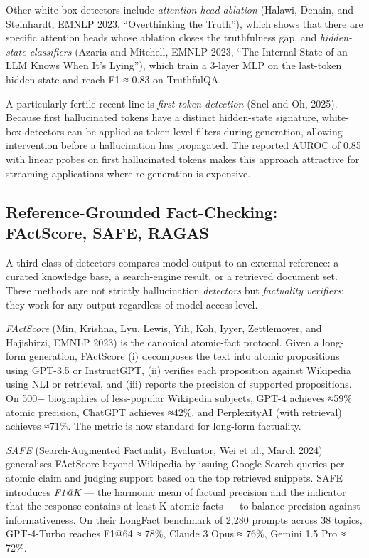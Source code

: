 Other white-box detectors include \emph{attention-head ablation} (Halawi, Denain, and Steinhardt, EMNLP 2023, ``Overthinking the Truth''), which shows that there are specific attention heads whose ablation closes the truthfulness gap, and \emph{hidden-state classifiers} (Azaria and Mitchell, EMNLP 2023, ``The Internal State of an LLM Knows When It's Lying''), which train a 3-layer MLP on the last-token hidden state and reach F1 ≈ 0.83 on TruthfulQA.

A particularly fertile recent line is \emph{first-token detection} (Snel and Oh, 2025). Because first hallucinated tokens have a distinct hidden-state signature, white-box detectors can be applied as token-level filters during generation, allowing intervention before a hallucination has propagated. The reported AUROC of 0.85 with linear probes on first hallucinated tokens makes this approach attractive for streaming applications where re-generation is expensive.

\subsection{Reference-Grounded Fact-Checking: FActScore, SAFE, RAGAS}\label{reference-grounded-fact-checking-factscore-safe-ragas}

A third class of detectors compares model output to an external reference: a curated knowledge base, a search-engine result, or a retrieved document set. These methods are not strictly hallucination \emph{detectors} but \emph{factuality verifiers}; they work for any output regardless of model access level.

\emph{FActScore} (Min, Krishna, Lyu, Lewis, Yih, Koh, Iyyer, Zettlemoyer, and Hajishirzi, EMNLP 2023) is the canonical atomic-fact protocol. Given a long-form generation, FActScore (i) decomposes the text into atomic propositions using GPT-3.5 or InstructGPT, (ii) verifies each proposition against Wikipedia using NLI or retrieval, and (iii) reports the precision of supported propositions. On 500+ biographies of less-popular Wikipedia subjects, GPT-4 achieves ≈59\% atomic precision, ChatGPT achieves ≈42\%, and PerplexityAI (with retrieval) achieves ≈71\%. The metric is now standard for long-form factuality.

\emph{SAFE} (Search-Augmented Factuality Evaluator, Wei et al., March 2024) generalises FActScore beyond Wikipedia by issuing Google Search queries per atomic claim and judging support based on the top retrieved snippets. SAFE introduces \emph{F1@K} --- the harmonic mean of factual precision and the indicator that the response contains at least K atomic facts --- to balance precision against informativeness. On their LongFact benchmark of 2,280 prompts across 38 topics, GPT-4-Turbo reaches F1@64 ≈ 78\%, Claude 3 Opus ≈ 76\%, Gemini 1.5 Pro ≈ 72\%.

